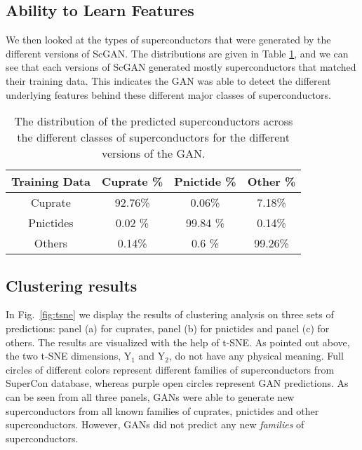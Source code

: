 \subsection{Ability to Learn Features}

We then looked at the types of superconductors that were generated by the different versions of ScGAN. The distributions are given in Table \ref{tab:by_class}, and we can see that each versions of ScGAN generated mostly superconductors that matched their training data. This indicates the GAN was able to detect the different underlying features behind these different major classes of superconductors.

\begin{table}
    \centering
    \begin{ruledtabular}
    \begin{tabular}{cccc}
        Training Data & Cuprate \% & Pnictide \% & Other \%\\
        \hline
        Cuprate  & 92.76\% &  0.06\% & 7.18\% \\
        Pnictides  & 0.02 \% & 99.84 \% & 0.14\% \\
        Others &  0.14\% & 0.6 \% & 99.26\%
    \end{tabular}
    \end{ruledtabular}
    
    \caption{The distribution of the predicted superconductors across the different classes of superconductors for the different versions of the GAN.}
    \label{tab:by_class}
\end{table}

\subsection{Clustering results}

In Fig.~\ref{fig:tsne} we display the results of 
clustering analysis on three sets of predictions: panel (a)
for cuprates, panel (b) for pnictides and panel (c) for 
others. The results are visualized with the help of t-SNE.
As pointed out above, the two t-SNE dimensions, Y$_1$ and Y$_2$, do not have any physical
meaning. Full circles of different colors represent different families of superconductors
from SuperCon database, whereas purple open circles represent GAN 
predictions. As can be seen from all three panels, GANs
were able to generate new superconductors from all known families 
of cuprates, pnictides and other superconductors. However,
GANs did not predict any new {\it families} of 
superconductors. 

